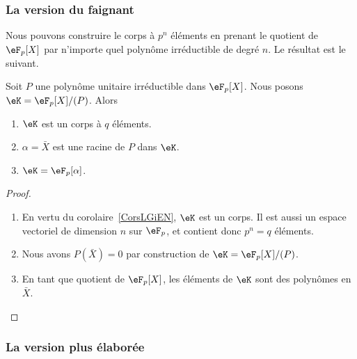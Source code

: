 \subsubsection{La version du faignant}

Nous pouvons construire le corps à \( p^n\) éléments en prenant le quotient de \( \eF_p[X]\) par n'importe quel polynôme irréductible de degré \( n\). Le résultat est le suivant.
\begin{proposition} \label{PropHfrNCB}
    Soit \( P\) une polynôme unitaire irréductible dans \( \eF_p[X]\). Nous posons \( \eK=\eF_p[X]/(P)\). Alors
    \begin{enumerate}
        \item
            \( \eK\) est un corps à \( q\) éléments.
        \item
            \( \alpha=\bar X\) est une racine de \( P\) dans \( \eK\).
        \item   \label{ItemiEFRTg}
            \( \eK=\eF_p[\alpha]\).
    \end{enumerate}
\end{proposition}

\begin{proof}
    \begin{enumerate}
        \item
            En vertu du corolaire~\ref{CorsLGiEN}, \( \eK\) est un corps. Il est aussi un espace vectoriel de dimension \( n\) sur \( \eF_p\), et contient donc \( p^n=q\) éléments.
        \item
            Nous avons \( P(\bar X)=0\) par construction de \( \eK=\eF_p[X]/(P)\).
        \item
            En tant que quotient de \( \eF_p[X]\), les éléments de \( \eK\) sont des polynômes en \( \bar X\).
    \end{enumerate}
\end{proof}

\subsubsection{La version plus élaborée}


